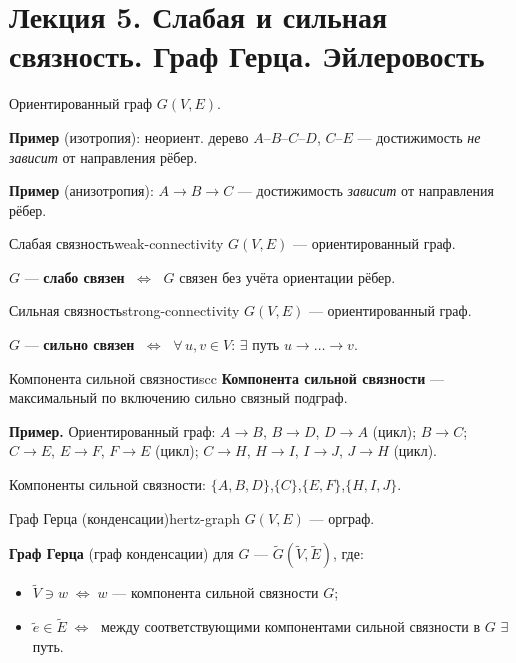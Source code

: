 \chapter{Лекция 5. Слабая и сильная связность. Граф Герца. Эйлеровость}


Ориентированный граф $G(V, E)$.


\textbf{Пример} (изотропия): неориент. дерево $A$--$B$--$C$--$D$, $C$--$E$ ---
достижимость \textit{не зависит} от направления рёбер.

\textbf{Пример} (анизотропия): $A \to B \to C$ ---
достижимость \textit{зависит} от направления рёбер.

\begin{defn}{Слабая связность}{weak-connectivity}
$G(V, E)$ --- ориентированный граф.

$G$ --- \textbf{слабо связен} $\;\Leftrightarrow\;$ $G$ связен без учёта ориентации рёбер.
\end{defn}

\begin{defn}{Сильная связность}{strong-connectivity}
$G(V, E)$ --- ориентированный граф.

$G$ --- \textbf{сильно связен} $\;\Leftrightarrow\;$
$\forall\, u, v \in V$: $\exists$ путь $u \to \ldots \to v$.
\end{defn}

\begin{defn}{Компонента сильной связности}{scc}
\textbf{Компонента сильной связности} --- максимальный по включению
сильно связный подграф.
\end{defn}

\bigskip

\textbf{Пример.} Ориентированный граф:
$A \to B$,\; $B \to D$,\; $D \to A$ (цикл);
$B \to C$;\;
$C \to E$,\; $E \to F$,\; $F \to E$ (цикл);\;
$C \to H$,\; $H \to I$,\; $I \to J$,\; $J \to H$ (цикл).

Компоненты сильной связности:
$\{A, B, D\}$,\quad $\{C\}$,\quad $\{E, F\}$,\quad $\{H, I, J\}$.

\bigskip
\begin{defn}{Граф Герца (конденсации)}{hertz-graph}
$G(V, E)$ --- орграф.

\textbf{Граф Герца} (граф конденсации) для $G$ ---
$\tilde{G}(\tilde{V}, \tilde{E})$, где:
\begin{itemize}
  \item $\tilde{V} \ni w \;\Leftrightarrow\; w$ --- компонента сильной связности $G$;
  \item $\tilde{e} \in \tilde{E} \;\Leftrightarrow\;$ между соответствующими
        компонентами сильной связности в $G$ $\exists$ путь.
\end{itemize}
\end{defn}

